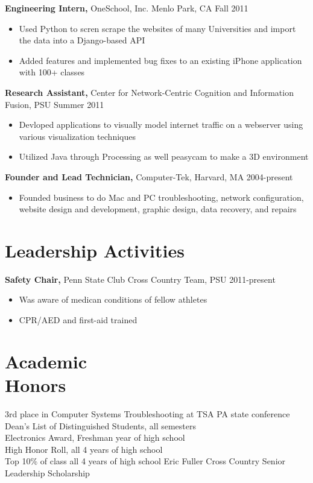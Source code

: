 \documentclass[margin]{res}
\begin{document}
\begin{resume}
{\bf Engineering Intern,} OneSchool, Inc. Menlo Park, CA \hfill Fall 2011
\begin{itemize} \itemsep -2pt %
\item Used Python to scren scrape the websites of many Universities and import the data into a Django-based API
\item Added features and implemented bug fixes to an existing iPhone application with 100+ classes
\end{itemize}

{\bf Research Assistant,} Center for Network-Centric Cognition and Information Fusion, PSU \hfill Summer 2011
\begin{itemize} \itemsep -2pt
\item Devloped applications to visually model internet traffic on a webserver using various visualization techniques 
\item Utilized Java through Processing as well peasycam to make a 3D environment
\end{itemize}

{\bf Founder and Lead Technician,} Computer-Tek, Harvard, MA \hfill 2004-present
\begin{itemize} \itemsep -2pt
\item Founded business to do Mac and PC troubleshooting, network configuration, website design and development, graphic design, data recovery, and repairs
\end{itemize}
\section{Leadership  Activities} 
{\bf Safety Chair,} Penn State Club Cross Country Team, PSU \hfill 2011-present 
\begin{itemize} \itemsep -2pt
\item Was aware of medican conditions of fellow athletes
\item CPR/AED and first-aid trained
\end{itemize}

\section{Academic \\ Honors} 
3rd place in Computer Systems Troubleshooting at TSA PA state conference
Dean's List of Distinguished Students, all semesters \\
Electronics Award, Freshman year of high school \\
High Honor Roll, all 4 years of high school \\
Top 10\% of class all 4 years of high school 
Eric Fuller Cross Country Senior Leadership Scholarship


\end{resume}
\end{document}
